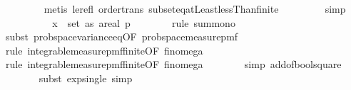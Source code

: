 \begin{isabellebody}
\ \ \ \ \ \ \ \isamarkupfalse%
\ {\isacharparenleft}{\kern0pt}metis\ le{\isacharunderscore}{\kern0pt}refl\ order{\isacharunderscore}{\kern0pt}trans\ subset{\isacharunderscore}{\kern0pt}eq{\isacharunderscore}{\kern0pt}atLeast{}{\isacharunderscore}{\kern0pt}lessThan{\isacharunderscore}{\kern0pt}finite{\isacharparenright}{\kern0pt}\ \isanewline
\ \ \ \ \ \ \isamarkupfalse%
\ simp\isanewline
\ \ \ \ \isamarkupfalse%
\ \isamarkupfalse%
\ {\isachardoublequoteopen}{\isachardot}{\kern0pt}{\isachardot}{\kern0pt}{\isachardot}{\kern0pt}\ {\isasymle}\ {\isacharparenleft}{\kern0pt}{\isasymSum}\ x\ {\isasymin}\ set\ as{\isachardot}{\kern0pt}\ {\isacharparenleft}{\kern0pt}a{\isacharplus}{\kern0pt}{}{\isacharparenright}{\kern0pt}{\isacharslash}{\kern0pt}real\ p{\isacharparenright}{\kern0pt}{\isachardoublequoteclose}\isanewline
\ \ \ \ \ \ \isamarkupfalse%
\ {\isacharparenleft}{\kern0pt}rule\ sum{\isacharunderscore}{\kern0pt}mono{\isacharparenright}{\kern0pt}\isanewline
\ \ \ \ \ \ \isamarkupfalse%
\ {\isacharparenleft}{\kern0pt}subst\ prob{\isacharunderscore}{\kern0pt}space{\isachardot}{\kern0pt}variance{\isacharunderscore}{\kern0pt}eq{\isacharbrackleft}{\kern0pt}OF\ prob{\isacharunderscore}{\kern0pt}space{\isacharunderscore}{\kern0pt}measure{\isacharunderscore}{\kern0pt}pmf{\isacharbrackright}{\kern0pt}{\isacharparenright}{\kern0pt}\isanewline
\ \ \ \ \ \ \ \isamarkupfalse%
\ {\isacharparenleft}{\kern0pt}rule\ integrable{\isacharunderscore}{\kern0pt}measure{\isacharunderscore}{\kern0pt}pmf{\isacharunderscore}{\kern0pt}finite{\isacharbrackleft}{\kern0pt}OF\ fin{\isacharunderscore}{\kern0pt}omega{\isacharunderscore}{\kern0pt}{}{\isacharbrackright}{\kern0pt}{\isacharparenright}{\kern0pt}\isanewline
\ \ \ \ \ \ \ \isamarkupfalse%
\ {\isacharparenleft}{\kern0pt}rule\ integrable{\isacharunderscore}{\kern0pt}measure{\isacharunderscore}{\kern0pt}pmf{\isacharunderscore}{\kern0pt}finite{\isacharbrackleft}{\kern0pt}OF\ fin{\isacharunderscore}{\kern0pt}omega{\isacharunderscore}{\kern0pt}{}{\isacharbrackright}{\kern0pt}{\isacharparenright}{\kern0pt}\isanewline
\ \ \ \ \ \ \isamarkupfalse%
\ {\isacharparenleft}{\kern0pt}simp\ add{\isacharcolon}{\kern0pt}of{\isacharunderscore}{\kern0pt}bool{\isacharunderscore}{\kern0pt}square{\isacharparenright}{\kern0pt}\isanewline
\ \ \ \ \ \ \isamarkupfalse%
\ {\isacharparenleft}{\kern0pt}subst\ exp{\isacharunderscore}{\kern0pt}single{\isacharcomma}{\kern0pt}\ simp{\isacharparenright}{\kern0pt}\isanewline

\end{isabellebody}
